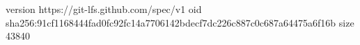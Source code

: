 version https://git-lfs.github.com/spec/v1
oid sha256:91cf1168444fad0fc92fc14a7706142bdecf7dc226c887c0c687a64475a6f16b
size 43840
